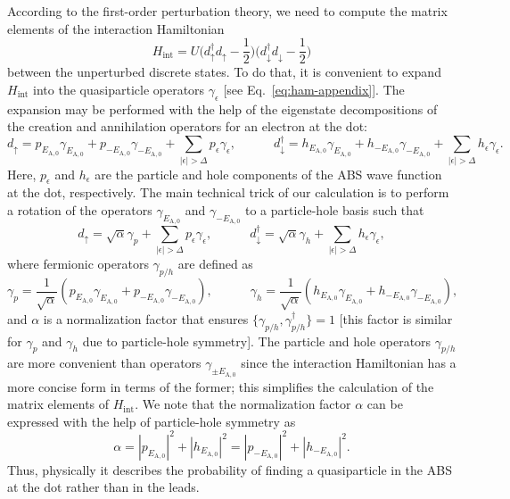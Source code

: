 \documentclass[aps,reprint,longbibliography, prb]{revtex4-2}
\begin{document}
According to the first-order perturbation theory, we need to compute the matrix elements of the interaction Hamiltonian
\begin{equation}\label{eq:Hint_app}
H_\mathrm{int} = U\bigl(d_{\uparrow}^{\dagger}d_{\uparrow}-\frac{1}{2}\bigr)\bigl(d_{\downarrow}^{\dagger}d_{\downarrow}-\frac{1}{2}\bigr)
\end{equation}
between the unperturbed discrete states. To do that, it is convenient to expand $H_\mathrm{int}$ into the quasiparticle operators $\gamma_\epsilon$ [see Eq.~\eqref{eq:ham-appendix}]. The expansion may be performed with the help of the eigenstate decompositions of the creation and annihilation operators for an electron at the dot:
\begin{equation}
\label{eq:ph-operators-1}
d_\uparrow =p_{E_\mathrm{A,0}}\gamma_{E_\mathrm{A,0}}+p_{-E_\mathrm{A,0}}\gamma_{-E_\mathrm{A,0}}+\sum_{|\epsilon|>\Delta}p_\epsilon \gamma_\epsilon, \quad\quad\quad d_\downarrow^\dagger = h_{E_\mathrm{A,0}}\gamma_{E_\mathrm{A,0}}+h_{-E_\mathrm{A,0}}\gamma_{-E_\mathrm{A,0}}+\sum_{|\epsilon|>\Delta} h_\epsilon \gamma_\epsilon.
\end{equation}
Here, $p_\epsilon$ and $h_\epsilon$ are the particle and hole components of the ABS wave function at the dot, respectively. The main technical trick of our calculation is to perform a rotation of the operators $\gamma_{E_\mathrm{A,0}}$ and $\gamma_{-E_\mathrm{A,0}}$ to a particle-hole basis such that
\begin{equation}
\label{eq:ph-operators-2}
d_\uparrow =\sqrt{\alpha}
\gamma_p+\sum_{|\epsilon|>\Delta}p_{\epsilon}\gamma_{\epsilon},\quad\quad\quad d_\downarrow^\dagger=\sqrt{\alpha}\gamma_h+\sum_{|\epsilon|>\Delta}h_{\epsilon}\gamma_{\epsilon},
\end{equation}
where fermionic operators $\gamma_{p/h}$ are defined as
\begin{equation}
\label{eq:rotation}
\gamma_p = \frac{1}{\sqrt{\alpha}}\left(p_{E_\mathrm{A,0}}\gamma_{E_\mathrm{A,0}}+p_{-E_\mathrm{A,0}}\gamma_{-E_\mathrm{A,0}}\right),\quad\quad\quad\gamma_h = \frac{1}{\sqrt{\alpha}}\left(h_{E_\mathrm{A,0}}\gamma_{E_\mathrm{A,0}}+h_{-E_\mathrm{A,0}}\gamma_{-E_\mathrm{A,0}}\right),
\end{equation}
and $\alpha$ is a normalization factor that ensures $\{\gamma_{p/h}, \gamma^\dagger_{p/h}\} = 1$ [this factor is similar for $\gamma_p$ and $\gamma_h$ due to particle-hole symmetry]. The particle and hole operators $\gamma_{p/h}$ are more convenient than operators $\gamma_{\pm E_\mathrm{A,0}}$ since the interaction Hamiltonian has a more concise form in terms of the former; this simplifies the calculation of the matrix elements of ${H}_\mathrm{int}$. 
We note that the normalization factor $\alpha$ can be expressed with the help of particle-hole symmetry as
\begin{equation}
    \alpha = |p_{E_\mathrm{A,0}}|^2 + |h_{E_\mathrm{A,0}}|^2 = |p_{-E_\mathrm{A,0}}|^2 + |h_{-E_\mathrm{A,0}}|^2.
\end{equation}
Thus, physically it describes the probability of finding a quasiparticle in the ABS at the dot rather than in the leads.
\end{document}
